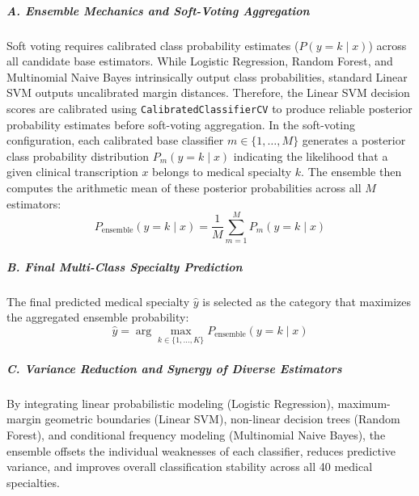 \subparagraph{A. Ensemble Mechanics and Soft-Voting Aggregation}
Soft voting requires calibrated class probability estimates ($P(y = k \mid x)$) across all candidate base estimators. While Logistic Regression, Random Forest, and Multinomial Naive Bayes intrinsically output class probabilities, standard Linear SVM outputs uncalibrated margin distances. Therefore, the Linear SVM decision scores are calibrated using \texttt{CalibratedClassifierCV} to produce reliable posterior probability estimates before soft-voting aggregation. In the soft-voting configuration, each calibrated base classifier $m \in \{1, \dots, M\}$ generates a posterior class probability distribution $P_m(y = k \mid x)$ indicating the likelihood that a given clinical transcription $x$ belongs to medical specialty $k$. The ensemble then computes the arithmetic mean of these posterior probabilities across all $M$ estimators:
\begin{equation}
P_{\text{ensemble}}(y = k \mid x) = \frac{1}{M} \sum_{m=1}^{M} P_m(y = k \mid x)
\end{equation}

\subparagraph{B. Final Multi-Class Specialty Prediction}
The final predicted medical specialty $\hat{y}$ is selected as the category that maximizes the aggregated ensemble probability:
\begin{equation}
\hat{y} = \arg\max_{k \in \{1, \dots, K\}} P_{\text{ensemble}}(y = k \mid x)
\end{equation}

\subparagraph{C. Variance Reduction and Synergy of Diverse Estimators}
By integrating linear probabilistic modeling (Logistic Regression), maximum-margin geometric boundaries (Linear SVM), non-linear decision trees (Random Forest), and conditional frequency modeling (Multinomial Naive Bayes), the ensemble offsets the individual weaknesses of each classifier, reduces predictive variance, and improves overall classification stability across all 40 medical specialties.

